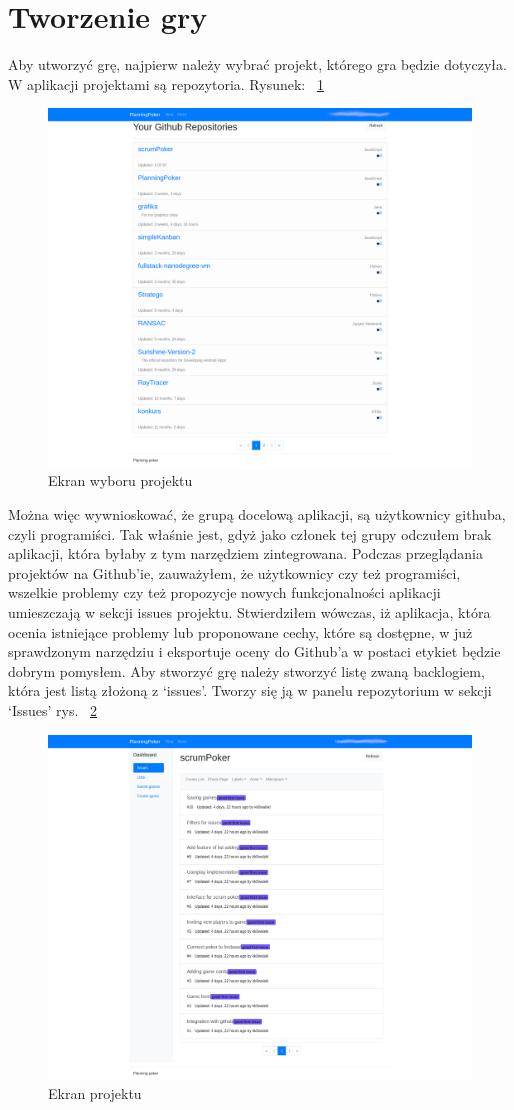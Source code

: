 \section{Tworzenie gry}
Aby utworzyć grę, najpierw należy wybrać projekt, którego gra będzie dotyczyła.
W aplikacji projektami są repozytoria. Rysunek: 
~\ref{rys:projekty}
\begin{figure}
	\centering\includegraphics[width=.7\textwidth]{img/repositories}
	\caption{Ekran wyboru projektu}\label{rys:projekty}%
\end{figure}
Można więc wywnioskować, że grupą docelową aplikacji, są użytkownicy githuba, czyli programiści.
Tak właśnie jest, gdyż jako członek tej grupy odczułem brak aplikacji, która byłaby z tym narzędziem zintegrowana.
Podczas przeglądania projektów na Github'ie, zauważyłem, że użytkownicy czy też programiści,
wszelkie problemy czy też propozycje nowych funkcjonalności aplikacji umieszczają w sekcji issues projektu.
Stwierdziłem wówczas, iż aplikacja, która ocenia istniejące problemy lub proponowane cechy, które są dostępne,
w już sprawdzonym narzędziu i eksportuje oceny do Github'a w postaci etykiet będzie dobrym pomysłem.
Aby stworzyć grę należy stworzyć listę zwaną backlogiem, która jest listą złożoną z `issues'.
Tworzy się ją w panelu repozytorium w sekcji `Issues' rys.
~\ref{rys:issues} 
\begin{figure}
	\centering\includegraphics[width=.7\textwidth]{img/issues}
	\caption{Ekran projektu}\label{rys:issues}%
\end{figure}
